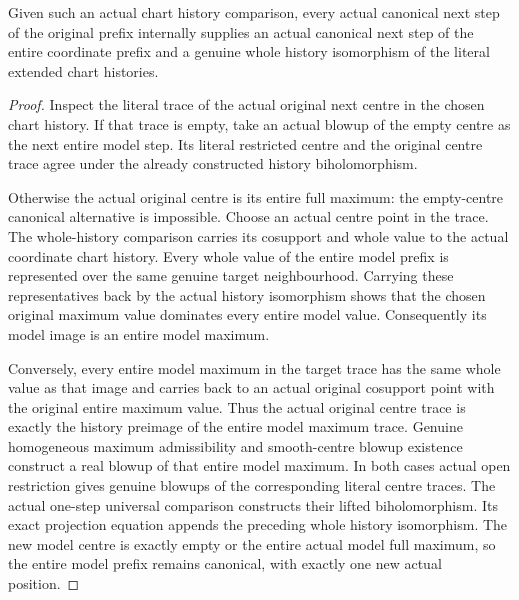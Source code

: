 \begin{lemma}
\label{hir:general-nc-actual-chart-history-next-model-step}
Given such an actual chart history comparison, every actual canonical
next step of the original prefix internally supplies an actual
canonical next step of the entire coordinate prefix and a genuine
whole history isomorphism of the literal extended chart histories.
\leanok
{}
\end{lemma}
\begin{proof}
Inspect the literal trace of the actual original next centre in the
chosen chart history. If that trace is empty, take an actual
blowup of the empty centre as the next entire model step. Its literal
restricted centre and the original centre trace agree under the
already constructed history biholomorphism.

Otherwise the actual original centre is its entire full maximum:
the empty-centre canonical alternative is impossible. Choose an
actual centre point in the trace. The whole-history comparison carries
its cosupport and whole value to the actual coordinate chart history.
Every whole value of the entire model prefix is represented over the
same genuine target neighbourhood. Carrying these representatives
back by the actual history isomorphism shows that the chosen original
maximum value dominates every entire model value. Consequently its
model image is an entire model maximum.

Conversely, every entire model maximum in the target trace has the
same whole value as that image and carries back to an actual original
cosupport point with the original entire maximum value. Thus the
actual original centre trace is exactly the history preimage of the
entire model maximum trace. Genuine homogeneous maximum admissibility
and smooth-centre blowup existence construct a real blowup of that
entire model maximum. In both cases actual open restriction gives
genuine blowups of the corresponding literal centre traces. The
actual one-step universal comparison constructs their lifted
biholomorphism. Its exact projection equation appends the preceding
whole history isomorphism. The new model centre is exactly empty or
the entire actual model full maximum, so the entire model prefix
remains canonical, with exactly one new actual position.
\end{proof}

